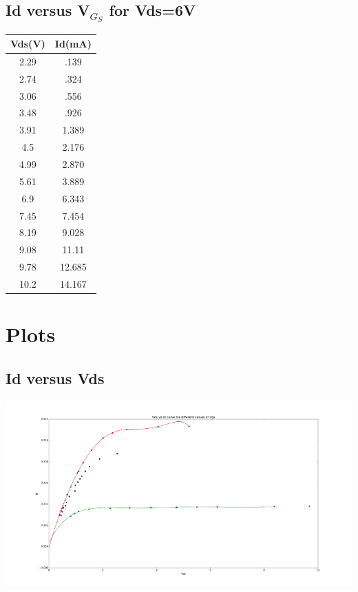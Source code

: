 \documentclass[12pt]{article}
\begin{document}
\subsection{Id versus V$_G_S$ for Vds=6V}
\begin{center}
 \begin{tabular}{|| c | c||} 
 \hline
 Vds(V) & Id(mA) \\ [0.5ex] 
 \hline\hline
 2.29&.139\\
 \hline
 2.74&.324\\
 \hline
 3.06&.556\\
 \hline
 3.48&.926\\
 \hline
 3.91&1.389\\
 \hline
 4.5&2.176\\
 \hline
 4.99&2.870\\
 \hline
 5.61&3.889\\
 \hline
 6.9&6.343\\
 \hline
 7.45&7.454\\
 \hline
 8.19&9.028\\
 \hline
 9.08&11.11\\
 \hline
 9.78&12.685\\
 \hline
 10.2&14.167\\
 \hline
 


\end{tabular}
\end{center}
 
 
 

\section*{Plots}

\subsection*{Id versus Vds}
\begin{center}
    \includegraphics{figure_11.png}
\end{center}
\end{document}
